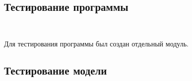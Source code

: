 \
\subsection{Тестирование программы}
\

Для тестирования программы был создан отдельный модуль.
\newpage

\subsection{Тестирование модели}
\
\newpage

